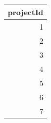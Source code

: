 \begin{tabular}{r}
\toprule
projectId \\
\midrule
1 \\
2 \\
3 \\
4 \\
5 \\
6 \\
7 \\
\bottomrule
\end{tabular}
